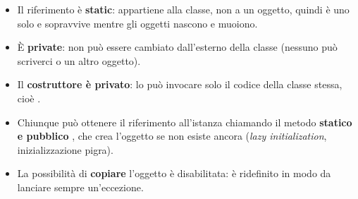 \begin{itemize}
  \item Il riferimento  è \textbf{static}: appartiene alla classe, non a un oggetto, quindi è uno solo
        e sopravvive mentre gli oggetti nascono e muoiono.
  \item È \textbf{private}: non può essere cambiato dall'esterno della classe (nessuno può scriverci  o un altro
        oggetto).
  \item Il \textbf{costruttore è privato}: lo può invocare solo il codice della classe stessa, cioè
        .
  \item Chiunque può ottenere il riferimento all'istanza chiamando il metodo \textbf{statico e pubblico}
        , che crea l'oggetto se non esiste ancora (\textit{lazy initialization},
        inizializzazione pigra).
  \item La possibilità di \textbf{copiare} l'oggetto è disabilitata:  è ridefinito in modo da lanciare sempre
        un'eccezione.
\end{itemize}

